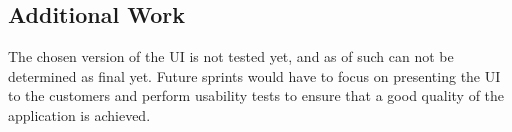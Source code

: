 \subsection{Additional Work}
The chosen version of the UI is not tested yet, and as of such can not be determined as final yet.
Future sprints would have to focus on presenting the UI to the customers and perform usability tests to ensure that a good quality of the application is achieved.